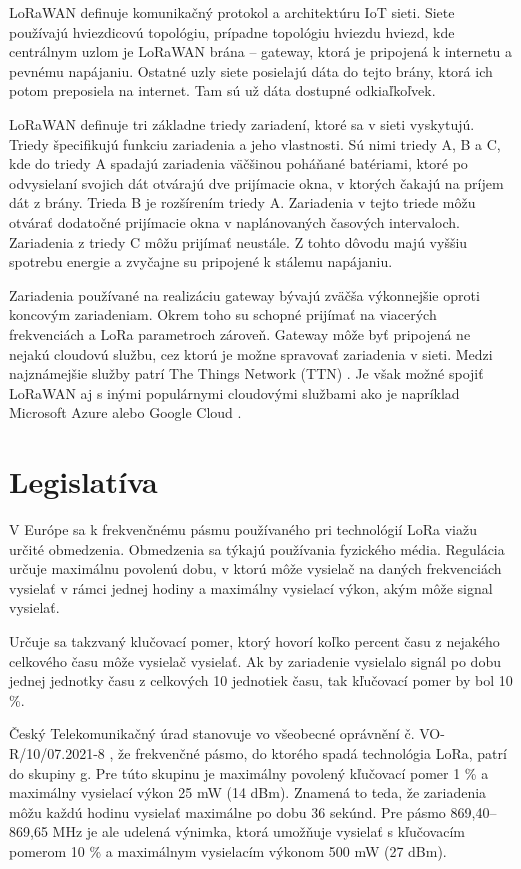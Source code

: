 \documentclass[slovak,master]{diploma}
\begin{document}
LoRaWAN definuje komunikačný protokol a architektúru IoT sieti. Siete používajú hviezdicovú topológiu, prípadne topológiu hviezdu hviezd, kde 
centrálnym uzlom je LoRaWAN brána -- gateway, ktorá je pripojená k internetu a pevnému napájaniu. Ostatné uzly siete posielajú dáta do tejto brány, 
ktorá ich potom preposiela na internet. Tam sú už dáta dostupné odkiaľkoľvek.

LoRaWAN definuje tri základne triedy zariadení, ktoré sa v sieti vyskytujú. Triedy špecifikujú funkciu zariadenia a jeho vlastnosti.
Sú nimi triedy A, B a C, kde do triedy A spadajú zariadenia väčšinou poháňané batériami, ktoré po odvysielaní svojich dát otvárajú dve prijímacie okna, 
v ktorých čakajú na príjem dát z brány.
Trieda B je rozšírením triedy A. Zariadenia v tejto triede môžu otvárať dodatočné prijímacie okna v naplánovaných časových intervaloch.
Zariadenia z triedy C môžu prijímať neustále. Z tohto dôvodu majú vyššiu spotrebu energie a zvyčajne su pripojené k stálemu napájaniu.

Zariadenia používané na realizáciu gateway bývajú zväčša výkonnejšie oproti koncovým zariadeniam. Okrem toho su schopné prijímať na viacerých frekvenciách a
LoRa parametroch zároveň. Gateway môže byť pripojená ne nejakú cloudovú službu, cez ktorú je možne spravovať zariadenia v sieti. Medzi najznámejšie 
služby patrí The Things Network (TTN) \cite{ttn}. Je však možné spojiť LoRaWAN aj s inými populárnymi cloudovými službami ako je napríklad Microsoft Azure \cite{azure} 
alebo Google Cloud \cite{googleCloud}.

\section{Legislatíva}
V Európe sa k frekvenčnému pásmu používaného pri technológií LoRa viažu určité obmedzenia. 
Obmedzenia sa týkajú používania fyzického média. Regulácia určuje maximálnu povolenú dobu, v ktorú môže vysielač na daných frekvenciách vysielať 
v rámci jednej hodiny a maximálny vysielací výkon, akým môže signal vysielať.

Určuje sa takzvaný klučovací pomer, ktorý hovorí koľko percent času z nejakého celkového času môže vysielač vysielať.
Ak by zariadenie vysielalo signál po dobu jednej jednotky času z celkových 10 jednotiek času, tak kľučovací pomer by bol 10 \%.

Český Telekomunikačný úrad stanovuje vo všeobecné oprávnění č. VO-R/10/07.2021-8 \cite{vor}, že 
frekvenčné pásmo, do ktorého spadá technológia LoRa, patrí do skupiny g. Pre túto skupinu je maximálny povolený kľučovací pomer 1 \% a maximálny 
vysielací výkon 25 mW (14 dBm). Znamená to teda, že zariadenia môžu každú hodinu vysielať maximálne po dobu 36 sekúnd.
Pre pásmo 869,40--869,65 MHz je ale udelená výnimka, ktorá umožňuje vysielať s kľučovacím pomerom 10 \% a maximálnym vysielacím výkonom 500 mW (27 dBm).
\end{document}
